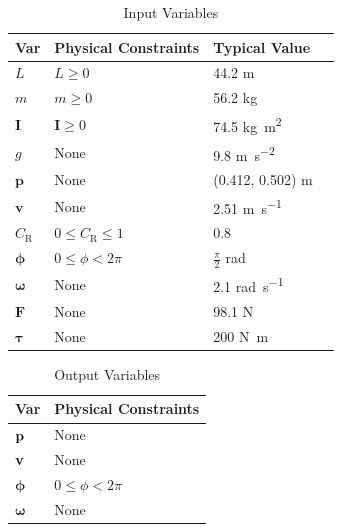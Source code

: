 \documentclass[12pt]{article}
\begin{document}
\renewcommand{\thetable}{1}
\begin{table}[!h]
\renewcommand{\arraystretch}{1.2}
\noindent \begin{longtable}{l l l c} 
  \toprule
  \textbf{Var} & \textbf{Physical Constraints} & \textbf{Typical Value} \\
  \midrule 
  $L$ 			& $L\ge0$			&44.2 \si{\metre}
  \\
  $m$			& $m \ge 0$		&	56.2 \si{\kilogram} 
  \\
  $\mathbf{I}$   & $\mathbf{I} \ge 0$ & 74.5 \si{\kilogram\metre\tothe{2}}
  \\
  $g$			& None			& 9.8 \si{\metre\per\second\tothe{2}}	
  \\
  $\mathbf{p}$		& None			& (0.412, 0.502) \si{\metre}	
  \\
  $\mathbf{v}$			 & None 			& 2.51 \si{\metre\per\second}	
  \\
  $C_\text{R}$  	& $ 0 \le C_\text{R} \le 1$	& 0.8 
  \\
  $\boldsymbol \phi$		 & $ 0 \le \phi< 2\pi $	&$\frac{\pi}{2} $ \si{\radian}
  \\	
  $\boldsymbol \omega$ 		& None 			& 2.1 \si{\radian\per\second}
  \\
  $\mathbf{F}$	&	None			& 98.1 \si{\newton}
  \\
  $\boldsymbol{\tau}$ & None		& 200 \si{\newton\metre} 
  \\

  \bottomrule
\end{longtable}
\bigskip
\caption{Input Variables} \label{TblInputVar}
\end{table}

\renewcommand{\thetable}{2}
\begin{table}[!h]
\renewcommand{\arraystretch}{1.2}
\noindent \begin{longtable}{l l} 
  \toprule
  \textbf{Var} & \textbf{Physical Constraints} \\
  \midrule 
  $\bf p$ 		& None
  \\
  $\bf v$ 		& None
  \\
  $\boldsymbol \phi$	&$ 0 \le \phi< 2\pi $
  \\
  $\boldsymbol \omega$	& None
  \\
  \bottomrule
\end{longtable}
\bigskip
\caption{Output Variables} \label{TblOutputVar}
\end{table}
\end{document}

